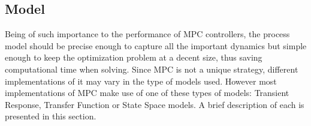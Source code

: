 \subsection{Model}%

Being of such importance to the performance of MPC controllers, the process model should be precise enough to capture all the important dynamics but simple enough to keep the optimization problem at a decent size, thus saving computational time when solving. Since MPC is not a unique strategy, different implementations of it may vary in the type of models used. However most implementations of MPC make use of one of these types of models: Transient Response, Transfer Function or State Space models. A brief description of each is presented in this section.


